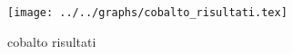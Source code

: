 \begin{figure}[h] \centering \texttt{[image: ../../graphs/cobalto\_risultati.tex]}\caption{cobalto risultati}\label{gr:cobalto_risultati} \end{figure}
